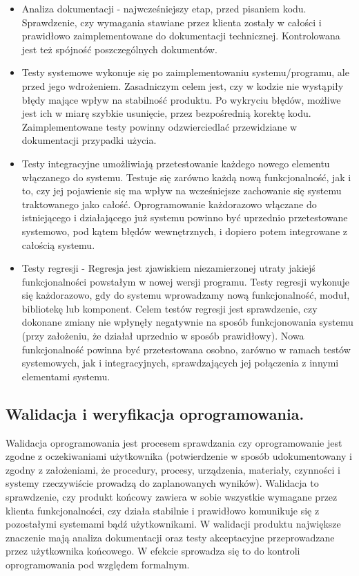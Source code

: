 \documentclass[a4paper,12pt,oneside]{book}
\begin{document}
				\begin{itemize}
                    \item Analiza dokumentacji - najwcześniejszy etap, przed pisaniem kodu. Sprawdzenie, czy wymagania stawiane przez klienta zostały w całości i prawidłowo zaimplementowane do dokumentacji technicznej. Kontrolowana jest też spójność poszczególnych dokumentów.
                    \item Testy systemowe wykonuje się po zaimplementowaniu systemu/programu, ale przed jego wdrożeniem. Zasadniczym celem jest, czy w kodzie nie wystąpiły błędy mające wpływ na stabilność produktu. Po wykryciu błędów, możliwe jest ich w miarę szybkie usunięcie, przez bezpośrednią korektę kodu. Zaimplementowane testy powinny odzwierciedlać przewidziane w dokumentacji przypadki użycia.
                    \item Testy integracyjne umożliwiają przetestowanie każdego nowego elementu włączanego do systemu. Testuje się zarówno każdą  nową funkcjonalność, jak i to, czy jej pojawienie się ma wpływ na wcześniejsze zachowanie się systemu traktowanego jako całość. Oprogramowanie każdorazowo włączane do istniejącego i działającego już systemu powinno być uprzednio przetestowane systemowo, pod kątem błędów wewnętrznych, i dopiero potem integrowane z całością systemu.
                    \item Testy regresji - Regresja jest zjawiskiem niezamierzonej utraty jakiejś funkcjonalności powstałym w nowej wersji programu. Testy regresji wykonuje się każdorazowo, gdy do systemu wprowadzamy nową funkcjonalność, moduł, bibliotekę lub komponent. Celem testów regresji jest sprawdzenie, czy dokonane zmiany nie wpłynęły negatywnie na sposób funkcjonowania systemu (przy założeniu, że działał uprzednio w sposób prawidłowy). Nowa funkcjonalność powinna być przetestowana osobno, zarówno w ramach testów systemowych, jak i integracyjnych, sprawdzających jej połączenia z innymi elementami systemu.
				\end{itemize}
			\newpage\subsection{Walidacja i weryfikacja oprogramowania.}
                Walidacja oprogramowania jest procesem sprawdzania czy 
                oprogramowanie jest zgodne z oczekiwaniami użytkownika (potwierdzenie w 
                sposób udokumentowany i zgodny z założeniami, że procedury, procesy, 
                urządzenia, materiały, czynności i systemy rzeczywiście prowadzą do 
                zaplanowanych wyników).
                Walidacja to sprawdzenie, czy produkt końcowy zawiera w sobie wszystkie 
                wymagane przez klienta funkcjonalności, czy działa stabilnie i prawidłowo 
                komunikuje się z pozostałymi systemami bądź użytkownikami. W walidacji 
                produktu największe znaczenie mają analiza dokumentacji oraz testy 
                akceptacyjne przeprowadzane przez użytkownika końcowego. W efekcie 
                sprowadza się to do kontroli oprogramowania pod względem formalnym.
\end{document}
